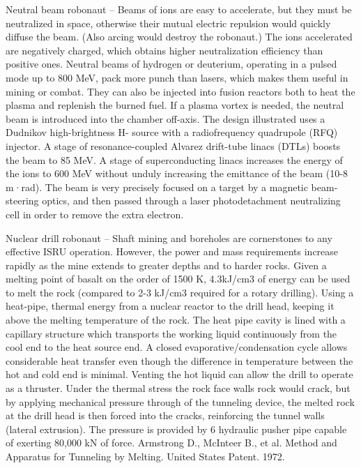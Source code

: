 \documentclass[a4paper]{book}
\begin{document}
Neutral beam robonaut – Beams of ions are easy to accelerate, but they must be neutralized in space, otherwise their mutual electric repulsion would quickly diffuse the beam. (Also arcing would destroy the robonaut.) The ions accelerated are negatively charged, which obtains higher neutralization efficiency than positive ones. Neutral beams of hydrogen or deuterium, operating in a pulsed mode up to 800 MeV, pack more punch than lasers, which makes them useful in mining or combat. They can also be injected into fusion reactors both to heat the plasma and replenish the burned fuel.  If a plasma vortex is needed, the neutral beam is introduced into the chamber off-axis.  The design illustrated uses a Dudnikov high-brightness H- source with a radiofrequency quadrupole (RFQ) injector.  A stage of resonance-coupled Alvarez drift-tube linacs (DTLs) boosts the beam to 85 MeV.  A stage of superconducting linacs increases the energy of the ions to 600 MeV without unduly increasing the emittance of the beam (10-8 m·rad).  The beam is very precisely focused on a target by a magnetic beam-steering optics, and then passed through a laser photodetachment neutralizing cell in order to remove the extra electron.
 
Nuclear drill robonaut – Shaft mining and boreholes are cornerstones to any effective ISRU operation.  However, the power and mass requirements increase rapidly as the mine extends to greater depths and to harder rocks.  Given a melting point of basalt on the order of 1500 K, 4.3kJ/cm3 of energy can be used to melt the rock (compared to 2-3 kJ/cm3 required for a rotary drilling).  Using a heat-pipe, thermal energy from a nuclear reactor to the drill head, keeping it above the melting temperature of the rock.  The heat pipe cavity is lined with a capillary structure which transports the working liquid continuously from the cool end to the heat source end.  A closed evaporative/condensation cycle allows considerable heat transfer even though the difference in temperature between the hot and cold end is minimal.   Venting the hot liquid can allow the drill to operate as a thruster. Under the thermal stress the rock face walls rock would crack, but by applying mechanical pressure through of the tunneling device, the melted rock at the drill head is then forced into the cracks, reinforcing the tunnel walls (lateral extrusion).  The pressure is provided by 6  hydraulic pusher pipe capable of exerting 80,000 kN of force. Armstrong D., McInteer B., et al.  Method and Apparatus for Tunneling by Melting. United States Patent. 1972.
  
\end{document}
